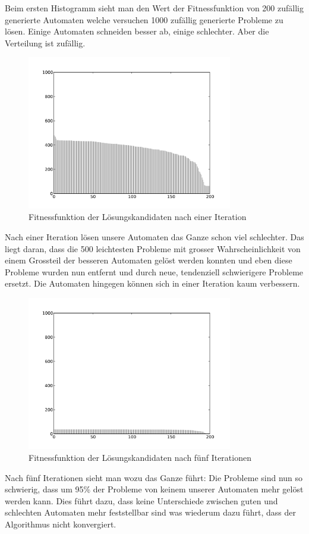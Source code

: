 Beim ersten Histogramm sieht man den Wert der Fitnessfunktion von 200 zufällig generierte Automaten welche versuchen 1000 zufällig generierte Probleme zu lösen. Einige Automaten schneiden besser ab, einige schlechter. Aber die Verteilung ist zufällig. 

\begin{figure}[h]
  \centering
  \includegraphics[width=0.8\textwidth]{./images/one_iteration.pdf}
  \caption[Fitnessfunktion der Lösungskandidaten nach einer Iteration]{Fitnessfunktion der Lösungskandidaten nach einer Iteration}
\end{figure}

Nach einer Iteration lösen unsere Automaten das Ganze schon viel schlechter. Das liegt daran, dass die 500 leichtesten Probleme mit grosser Wahrscheinlichkeit von einem Grossteil der besseren Automaten gelöst werden konnten und eben diese Probleme wurden nun entfernt und durch neue, tendenziell schwierigere Probleme ersetzt. Die Automaten hingegen können sich in einer Iteration kaum verbessern.

\begin{figure}[h]
  \centering
  \includegraphics[width=0.8\textwidth]{./images/fife_iterations.pdf}
  \caption[Fitnessfunktion der Lösungskandidaten nach fünf Iterationen]{Fitnessfunktion der Lösungskandidaten nach fünf Iterationen}
\end{figure}

Nach fünf Iterationen sieht man wozu das Ganze führt: Die Probleme sind nun so schwierig, dass um 95\% der Probleme von keinem unserer Automaten mehr gelöst werden kann. Dies führt dazu, dass keine Unterschiede zwischen guten und schlechten Automaten mehr feststellbar sind was wiederum dazu führt, dass der Algorithmus nicht konvergiert.